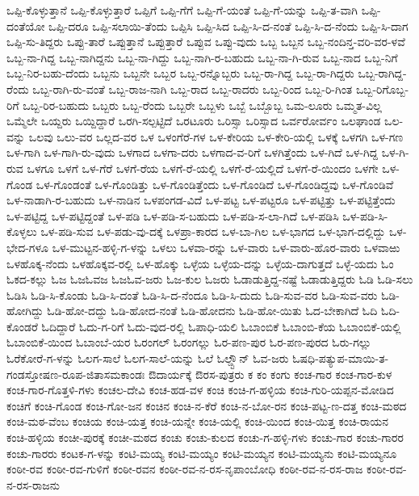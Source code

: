 ಒಪ್ಪಿ-ಕೊಳ್ಳುತ್ತಾನೆ
ಒಪ್ಪಿ-ಕೊಳ್ಳುತ್ತಾರೆ
ಒಪ್ಪಿಗೆ
ಒಪ್ಪಿ-ಗೆಗೆ
ಒಪ್ಪಿ-ಗೆ-ಯಂತೆ
ಒಪ್ಪಿ-ಗೆ-ಯನ್ನು
ಒಪ್ಪಿ-ತ-ವಾಗಿ
ಒಪ್ಪಿ-ದಂತೆಯೋ
ಒಪ್ಪಿ-ದರೂ
ಒಪ್ಪಿ-ಸಲಾಯಿ-ತೆಂದು
ಒಪ್ಪಿಸಿ
ಒಪ್ಪಿ-ಸಿದ
ಒಪ್ಪಿ-ಸಿ-ದ-ನಂತೆ
ಒಪ್ಪಿ-ಸಿ-ದ-ನೆಂದು
ಒಪ್ಪಿ-ಸಿ-ದಾಗ
ಒಪ್ಪಿ-ಸು-ತಿದ್ದರು
ಒಪ್ಪು-ತಾರೆ
ಒಪ್ಪುತ್ತಾನೆ
ಒಪ್ಪುತ್ತಾರೆ
ಒಪ್ಪುವ
ಒಪ್ಪು-ವುದು
ಒಬ್ಬ
ಒಬ್ಬನ
ಒಬ್ಬ-ನಂದಿನ್ತ-ವರಿ-ವರ-ಳವೆ
ಒಬ್ಬ-ನಾ-ಗಿದ್ದ
ಒಬ್ಬ-ನಾಗಿದ್ದನು
ಒಬ್ಬ-ನಾ-ಗಿದ್ದು
ಒಬ್ಬ-ನಾಗಿ-ರ-ಬಹುದು
ಒಬ್ಬ-ನಾ-ಗಿ-ರುವ
ಒಬ್ಬ-ನಾದ
ಒಬ್ಬ-ನಿಗೆ
ಒಬ್ಬ-ನಿರ-ಬಹು-ದೆಂದು
ಒಬ್ಬನು
ಒಬ್ಬನೇ
ಒಬ್ಬರ
ಒಬ್ಬ-ರನ್ನೊಬ್ಬರು
ಒಬ್ಬ-ರಾ-ಗಿದ್ದ
ಒಬ್ಬ-ರಾ-ಗಿದ್ದರು
ಒಬ್ಬ-ರಾಗಿದ್ದ-ರೆಂದು
ಒಬ್ಬ-ರಾಗಿ-ರು-ವಂತೆ
ಒಬ್ಬ-ರಾಜ-ನಾಗಿ
ಒಬ್ಬ-ರಾದ
ಒಬ್ಬ-ರಾದರು
ಒಬ್ಬ-ರಿಂದ
ಒಬ್ಬ-ರಿ-ಗಿಂತ
ಒಬ್ಬ-ರಿಗೊಬ್ಬ-ರಿಗೆ
ಒಬ್ಬ-ರಿರ-ಬಹುದು
ಒಬ್ಬರು
ಒಬ್ಬ-ರೆಂದು
ಒಬ್ಬರೇ
ಒಬ್ಬಳು
ಒಬ್ಬೆ
ಒಬ್ಬೊಬ್ಬ
ಒಮ-ಲೂರು
ಒಮ್ಮತ-ವಿಲ್ಲ
ಒಮ್ಮೆಲೇ
ಒಯ್ದರು
ಒಯ್ದಿದ್ದಾರೆ
ಒರಗಿ-ಸಲ್ಪಟ್ಟಿದೆ
ಒರಟೂರು
ಒರಿಸ್ಸಾ
ಒರಿಸ್ಸಾದ
ಒರ್ವರೋರ್ವಂ
ಒಲಘಾಂಡ
ಒಲ-ವನ್ನು
ಒಲವು
ಒಲು-ವರ
ಒಲ್ಲದ-ವರ
ಒಳ
ಒಳಂಗೆರೆ-ಗಳ
ಒಳ-ಕೇರಿಯ
ಒಳ-ಕೇರಿ-ಯಲ್ಲಿ
ಒಳಕ್ಕೆ
ಒಳಗಗಿ
ಒಳ-ಗಣ
ಒಳ-ಗಾಗಿ
ಒಳ-ಗಾಗಿ-ರು-ವುದು
ಒಳಗಾದ
ಒಳಗಾ-ದರು
ಒಳಗಾದ-ವ-ರಿಗೆ
ಒಳಗಿತ್ತೆಂದು
ಒಳ-ಗಿದೆ
ಒಳ-ಗಿದ್ದ
ಒಳ-ಗಿ-ರುವ
ಒಳಗೂ
ಒಳಗೆ
ಒಳ-ಗೆರೆ
ಒಳಗೆ-ರೆಯ
ಒಳಗೆ-ರೆ-ಯಲ್ಲಿ
ಒಳಗೆ-ರೆ-ಯಲ್ಲಿದೆ
ಒಳಗೆ-ರೆ-ಯಿಂದಂ
ಒಳಗೇ
ಒಳ-ಗೊಂಡ
ಒಳ-ಗೊಂಡಂತೆ
ಒಳ-ಗೊಂಡಿತ್ತು
ಒಳ-ಗೊಂಡಿತ್ತೆಂದು
ಒಳ-ಗೊಂಡಿದೆ
ಒಳ-ಗೊಂಡಿದ್ದವು
ಒಳ-ಗೊಂಡಿವೆ
ಒಳ-ನಾಡಾಗಿ-ರ-ಬಹುದು
ಒಳ-ನಾಡಿನ
ಒಳಪಂಗಡ-ವಿದೆ
ಒಳ-ಪಟ್ಟ
ಒಳ-ಪಟ್ಟರೂ
ಒಳ-ಪಟ್ಟಿತ್ತು
ಒಳ-ಪಟ್ಟಿತ್ತೆಂದು
ಒಳ-ಪಟ್ಟಿದ್ದ
ಒಳ-ಪಟ್ಟಿದ್ದಂತೆ
ಒಳ-ಪಡಿ
ಒಳ-ಪಡಿ-ಸ-ಬಹುದು
ಒಳ-ಪಡಿ-ಸ-ಲಾ-ಗಿದೆ
ಒಳ-ಪಡಿಸಿ
ಒಳ-ಪಡಿ-ಸಿ-ಕೊಳ್ಳಲು
ಒಳ-ಪಡಿ-ಸುವ
ಒಳ-ಪಡು-ವು-ದಕ್ಕೆ
ಒಳಪ್ರಾ-ಕಾರದ
ಒಳ-ಬಾ-ಗಿಲ
ಒಳ-ಭಾಗದ
ಒಳ-ಭಾಗ-ದಲ್ಲಿದ್ದು
ಒಳ-ಭೇದ-ಗಳೂ
ಒಳ-ಮುಟ್ಟನ-ಹಳ್ಳಿ-ಗ-ಳನ್ನು
ಒಳಲು
ಒಳವಾ-ರನ್ನು
ಒಳ-ವಾರು
ಒಳ-ವಾರು-ಹೊರ-ವಾರು
ಒಳವಾಱು
ಒಳಹೊಕ್ಕ-ನೆಂದು
ಒಳಹೊಕ್ಕವ-ರಲ್ಲಿ
ಒಳ-ಹೊಕ್ಕು
ಒಳ್ಳೆಯ
ಒಳ್ಳೆಯ-ದನ್ನು
ಒಳ್ಳೆಯ-ದಾಗುತ್ತದೆ
ಒಳ್ಳೆ-ಯದು
ಓಂ
ಓಕದ-ಕಲ್ಲು
ಓಜ
ಓಜಓವಜ
ಓಜಓವ-ಜರು
ಓಜ-ಕುಲ
ಓಜರು
ಓಡಾಡುತ್ತಿದ್ದ-ನಷ್ಟೆ
ಓಡಾಡುತ್ತಿದ್ದರು
ಓಡಿ
ಓಡಿ-ಸಲು
ಓಡಿಸಿ
ಓಡಿ-ಸಿ-ಕೊಂಡು
ಓಡಿ-ಸಿ-ದಂತೆ
ಓಡಿ-ಸಿ-ದ-ನೆಂದೂ
ಓಡಿ-ಸಿ-ದುದು
ಓಡಿ-ಸುವ-ವರ
ಓಡಿ-ಸುವ-ವರು
ಓಡಿ-ಹೋಗಿದ್ದು
ಓಡಿ-ಹೋ-ದದ್ದು
ಓಡಿ-ಹೋದ-ನಂತೆ
ಓಡಿ-ಹೋದನು
ಓಡಿ-ಹೋ-ಯಿತು
ಓದ-ಬೇಕಾಗಿದೆ
ಓದಿ
ಓದಿ-ಕೊಂಡರೆ
ಓದಿದ್ದಾರೆ
ಓದು-ಗ-ರಿಗೆ
ಓದು-ವುದ-ರಲ್ಲಿ
ಓಪಾಧಿ-ಯಲಿ
ಓಬಾಂಬಿಕೆ
ಓಬಾಂಬಿ-ಕೆಯ
ಓಬಾಂಬಿಕೆ-ಯಲ್ಲಿ
ಓಬಾಂಬಿಕೆ-ಯಿಂದ
ಓಬಾಂಬೆ-ಯರ
ಓರಂಗಲ್
ಓರಂಗಲ್ಲು
ಓರ-ಪಣ-ಪುರ
ಓರ-ಪಣ-ಪುರದ
ಓರು-ಗಲ್ಲು
ಓರೆಕೋರೆ-ಗ-ಳನ್ನು
ಓಲಗ-ಸಾಲೆ
ಓಲಗ-ಸಾಲೆ-ಯನ್ನು
ಓಲೆ
ಓಲ್ಡ್ಟೌನ್
ಓವ-ಜರು
ಓಷಧಿ-ಪತ್ಯುಪ-ಮಾಯಿ-ತ-ಗಂಡಸ್ತೋಷಣ-ರೂಪ-ಜಿತಾಸಮಕಾಂಡಃ
ಔದಾರ್ಯಕ್ಕೆ
ಔರಸ-ಪುತ್ರರು
ಕ
ಕಂ
ಕಂಗು
ಕಂಚ-ಗಾರ
ಕಂಚ-ಗಾರ-ಕುಳ
ಕಂಚ-ಗಾರ-ಗೊತ್ತಳಿ-ಗಳು
ಕಂಚಲ-ದೇವಿ
ಕಂಚ-ಹಡ-ವಳ
ಕಂಚಿ
ಕಂಚಿ-ಗ-ಹಳ್ಳಿಯ
ಕಂಚಿ-ಗುರಿ-ಯಪ್ಪನ-ಮೋಡಿದ
ಕಂಚಿಗೆ
ಕಂಚಿ-ಗೊಂಡ
ಕಂಚಿ-ಗೋ-ಜನ
ಕಂಚಿನ
ಕಂಚಿ-ನ-ಕೆರೆ
ಕಂಚಿ-ನ-ಬೋ-ರನ
ಕಂಚಿ-ಪಟ್ಟ-ಣ-ದತ್ತ
ಕಂಚಿ-ಮಠದ
ಕಂಚಿ-ಮಠ-ವೆಂಬ
ಕಂಚಿಯ
ಕಂಚಿ-ಯತ್ತ
ಕಂಚಿ-ಯನ್ನೇ
ಕಂಚಿ-ಯಲ್ಲಿ
ಕಂಚಿ-ಯಿಂದ
ಕಂಚಿ-ಯಿತ್ತ
ಕಂಚಿ-ರಾಯನ
ಕಂಚಿ-ಹಳ್ಳಿಯ
ಕಂಚೀ-ಪುರಕ್ಕೆ
ಕಂಚೀ-ಮಠದ
ಕಂಚು
ಕಂಚು-ಕುಲದ
ಕಂಚು-ಗ-ಹಳ್ಳಿ-ಗಳು
ಕಂಚು-ಗಾರ
ಕಂಚು-ಗಾರರ
ಕಂಚು-ಗಾರರು
ಕಂಟಕ-ಗ-ಳನ್ನು
ಕಂಟಿ-ಮಯ್ಯ
ಕಂಟಿ-ಮಯ್ಯಂ
ಕಂಟಿ-ಮಯ್ಯನ
ಕಂಟಿ-ಮಯ್ಯನು
ಕಂಟಿ-ಮಯ್ಯನೂ
ಕಂಠೀ-ರವ
ಕಂಠೀ-ರವ-ಗುಳಿಗೆ
ಕಂಠೀ-ರವನ
ಕಂಠೀ-ರವ-ನ-ರಸ-ನೃಪಾಂಬೋಧಿ
ಕಂಠೀ-ರವ-ನ-ರಸ-ರಾಜ
ಕಂಠೀ-ರವ-ನ-ರಸ-ರಾಜನು
